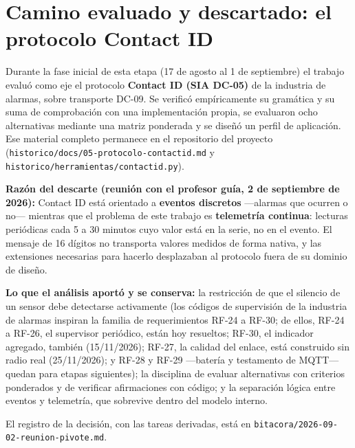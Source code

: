 \chapter[Camino descartado: Contact ID]{Camino evaluado y descartado: el protocolo Contact ID}
\label{anx:contactid}
\small

Durante la fase inicial de esta etapa (17 de agosto al 1 de septiembre) el trabajo evaluó como eje el
protocolo \textbf{Contact ID (SIA DC-05)} de la industria de alarmas, sobre transporte DC-09. Se
verificó empíricamente su gramática y su suma de comprobación con una implementación propia, se
evaluaron ocho alternativas mediante una matriz ponderada y se diseñó un perfil de aplicación. Ese
material completo permanece en el repositorio del proyecto (\texttt{historico/docs/05-protocolo-contactid.md} y
\texttt{historico/herramientas/contactid.py}).

\textbf{Razón del descarte (reunión con el profesor guía, 2 de septiembre de 2026):} Contact ID está
orientado a \textbf{eventos discretos} —alarmas que ocurren o no— mientras que el problema de este
trabajo es \textbf{telemetría continua}: lecturas periódicas cada 5 a 30 minutos cuyo valor está en
la serie, no en el evento. El mensaje de 16 dígitos no transporta valores medidos de forma nativa, y
las extensiones necesarias para hacerlo desplazaban al protocolo fuera de su dominio de diseño.

\textbf{Lo que el análisis aportó y se conserva:} la restricción de que el silencio de un sensor
debe detectarse activamente (los códigos de supervisión de la industria de alarmas inspiran la
familia de requerimientos RF-24 a RF-30; de ellos, RF-24 a RF-26, el supervisor periódico, están
hoy resueltos; RF-30, el indicador agregado, también (15/11/2026); RF-27, la calidad del enlace, está
construido sin radio real (25/11/2026); y RF-28 y RF-29 —batería y testamento de MQTT— quedan para
etapas siguientes); la
disciplina de evaluar alternativas con criterios ponderados y de verificar afirmaciones con código; y
la separación lógica entre eventos y telemetría, que sobrevive dentro del modelo interno.

El registro de la decisión, con las tareas derivadas, está en
\texttt{bitacora/2026-09-02-reunion-pivote.md}.
